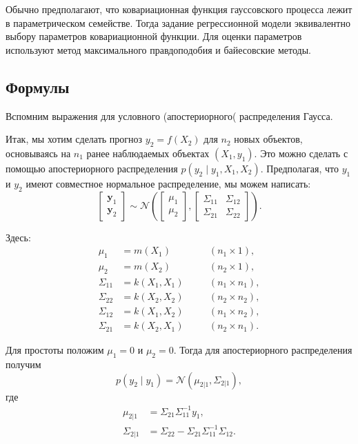 \documentclass[11pt,a4paper]{article}
\begin{document}
Обычно предполагают, что ковариационная функция гауссовского процесса
лежит в параметрическом семействе. Тогда задание регрессионной модели
эквивалентно выбору параметров ковариационной функции. Для оценки
параметров используют метод максимального правдоподобия и байесовские
методы.

    \hypertarget{ux444ux43eux440ux43cux443ux43bux44b}{%
\subsection{Формулы}\label{ux444ux43eux440ux43cux443ux43bux44b}}

Вспомним выражения для условного (апостериорного( распределения Гаусса.

Итак, мы хотим сделать прогноз \(y_2 = f(X_2)\) для \(n_2\) новых
объектов, основываясь на \(n_1\) ранее наблюдаемых объектах
\((X_1,y_1)\). Это можно сделать с помощью апостериорного распределения
\(p(y_2 \mid y_1, X_1, X_2)\). Предполагая, что \(y_1\) и \(y_2\) имеют
совместное нормальное распределение, мы можем написать:
\[
\left[\begin{array}{c} \mathbf{y}_{1} \\ \mathbf{y}_{2} \end{array}\right]
\sim
\mathcal{N} \left(
\left[\begin{array}{c} \mu_{1} \\ \mu_{2} \end{array}\right],
\left[ \begin{array}{cc}
\Sigma_{11} & \Sigma_{12} \\
\Sigma_{21} & \Sigma_{22}
\end{array} \right]
\right).
\]

Здесь: \[
\begin{aligned}
    \mu_{1}     &= m(X_1)     \quad && (n_1 \times 1),   \\
    \mu_{2}     &= m(X_2)     \quad && (n_2 \times 1),   \\
    \Sigma_{11} &= k(X_1,X_1) \quad && (n_1 \times n_1), \\
    \Sigma_{22} &= k(X_2,X_2) \quad && (n_2 \times n_2), \\
    \Sigma_{12} &= k(X_1,X_2) \quad && (n_1 \times n_2), \\
    \Sigma_{21} &= k(X_2,X_1) \quad && (n_2 \times n_1).
\end{aligned}
\]

    Для простоты положим \(\mu_{1} = 0\) и \(\mu_{2} = 0\). Тогда для
апостериорного распределения получим \[
  p(y_2 \mid y_1) = \mathcal{N}(\mu_{2|1}, \Sigma_{2|1}),
\] где \[
\begin{split}
    \mu_{2|1}    &= \Sigma_{21} \Sigma_{11}^{-1} y_1, \\
    \Sigma_{2|1} &= \Sigma_{22} - \Sigma_{21} \Sigma_{11}^{-1}\Sigma_{12}.
\end{split}
\]
\end{document}

